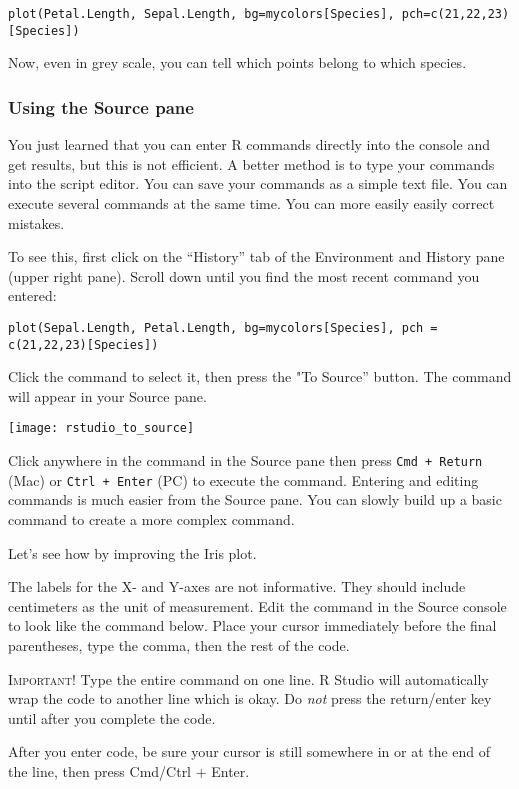 \documentclass[11pt]{article}
\begin{document}
\texttt{plot(Petal.Length, Sepal.Length, bg=mycolors{[}Species{]},
pch=c(21,22,23){[}Species{]})}

Now, even in grey scale, you can tell which points belong to which
species.


\subsubsection*{Using the Source pane}

You just learned that you can enter R commands directly into the console and get results, but this is not efficient. A better method is to type your commands into the script editor. You can save your commands as a simple text file. You can execute several commands at the same time. You can more easily easily correct mistakes.

To see this, first click on the “History” tab of the Environment and History pane (upper right pane). Scroll down until you find the most recent command you entered:

\texttt{plot(Sepal.Length, Petal.Length, bg=mycolors[Species], pch = c(21,22,23)[Species])}

Click the command to select it, then press the "To Source” button. The command will appear in your Source pane. 

\texttt{[image: rstudio\_to\_source]}

\bigskip

Click anywhere in the command in the Source pane then press \texttt{Cmd + Return} (Mac) or \texttt{Ctrl + Enter} (PC) to execute the command. Entering and editing commands is much easier from the Source pane. You can slowly build up a basic command to create a more complex command.

Let's see how by improving the Iris plot.

\newpage

The labels for the X- and Y-axes are not informative. They should
include centimeters as the unit of measurement. Edit the command in the Source console to look like the command below. Place your cursor immediately before the final parentheses, type the comma, then the rest of the code.

\textsc{Important!} Type the entire command on one line. R Studio will automatically wrap the code to another line which is okay. Do \textit{not} press the return/enter key until after you complete the code.

After you enter code, be sure your cursor is still somewhere in or at the end of the line, then press Cmd/Ctrl + Enter.
\end{document}
